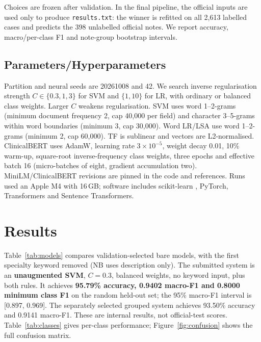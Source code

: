 \documentclass[twocolumn,10pt]{article}
\begin{document}
Choices are frozen after validation. In the final pipeline, the official inputs are used only to produce \texttt{results.txt}: the winner is refitted on all 2,613 labelled cases and predicts the 398 unlabelled official notes. We report accuracy, macro/per-class F1 and note-group bootstrap intervals.

\subsection{Parameters/Hyperparameters}
Partition and neural seeds are 20261008 and 42. We search inverse regularisation strength $C\in\{0.3,1,3\}$ for SVM and $\{1,10\}$ for LR, with ordinary or balanced class weights. Larger $C$ weakens regularisation. SVM uses word 1--2-grams (minimum document frequency 2, cap 40,000 per field) and character 3--5-grams within word boundaries (minimum 3, cap 30,000). Word LR/LSA use word 1--2-grams (minimum 2, cap 60,000). TF is sublinear and vectors are L2-normalised. ClinicalBERT uses AdamW, learning rate $3\times10^{-5}$, weight decay 0.01, 10\% warm-up, square-root inverse-frequency class weights, three epochs and effective batch 16 (micro-batches of eight, gradient accumulation two). MiniLM/ClinicalBERT revisions are pinned in the code and references. Runs used an Apple M4 with 16\,GB; software includes scikit-learn \cite{pedregosa2011}, PyTorch, Transformers and Sentence Transformers.

\section{Results}
Table~\ref{tab:models} compares validation-selected bare models, with the first specialty keyword removed (NB uses description only). The submitted system is an \textbf{unaugmented SVM}, $C=0.3$, balanced weights, no keyword input, plus both rules. It achieves \textbf{95.79\% accuracy, 0.9402 macro-F1 and 0.8000 minimum class F1} on the random held-out set; the 95\% macro-F1 interval is [0.897, 0.969]. The separately selected grouped system achieves 93.50\% accuracy and 0.9141 macro-F1. These are internal results, not official-test scores. Table~\ref{tab:classes} gives per-class performance; Figure~\ref{fig:confusion} shows the full confusion matrix.
\end{document}

